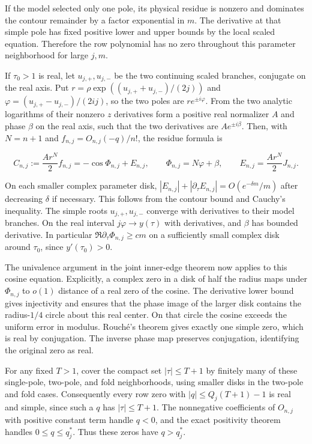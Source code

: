 \documentclass[11pt]{article}
\begin{document}
If the model selected only one pole, its physical residue is nonzero and dominates the contour remainder by a factor exponential in \(m\). The derivative at that simple pole has fixed positive lower and upper bounds by the local scaled equation. Therefore the row polynomial has no zero throughout this parameter neighborhood for large \(j,m\).

If \(\tau_0>1\) is real, let \(u_{j,+},u_{j,-}\) be the two continuing scaled branches, conjugate on the real axis. Put \(r=\rho\exp((u_{j,+}+u_{j,-})/(2j))\) and \(\varphi=(u_{j,+}-u_{j,-})/(2ij)\), so the two poles are \(r e^{\pm i\varphi}\). From the two analytic logarithms of their nonzero \(z\) derivatives form a positive real normalizer \(A\) and phase \(\beta\) on the real axis, such that the two derivatives are \(Ae^{\pm i\beta}\). Then, with \(N=n+1\) and \(f_{n,j}=O_{n,j}(-q)/n!\), the residue formula is

\begin{equation*}
C_{n,j}:=\frac{A r^N}{2} f_{n,j}=-\cos\Phi_{n,j}+E_{n,j},\qquad
\Phi_{n,j}=N\varphi+\beta,\qquad E_{n,j}=\frac{A r^N}{2}J_{n,j}.
\end{equation*}

On each smaller complex parameter disk, \(|E_{n,j}|+|\partial_\tau E_{n,j}|=O(e^{-\delta m}/m)\) after decreasing \(\delta\) if necessary. This follows from the contour bound and Cauchy's inequality. The simple roots \(u_{j,+},u_{j,-}\) converge with derivatives to their model branches. On the real interval \(j\varphi\to y(\tau)\) with derivatives, and \(\beta\) has bounded derivative. In particular \(\Re\partial_\tau\Phi_{n,j}\ge c m\) on a sufficiently small complex disk around \(\tau_0\), since \(y'(\tau_0)>0\).

The univalence argument in the joint inner-edge theorem now applies to this cosine equation. Explicitly, a complex zero in a disk of half the radius maps under \(\Phi_{n,j}\) to \(o(1)\) distance of a real zero of the cosine. The derivative lower bound gives injectivity and ensures that the phase image of the larger disk contains the radius-\(1/4\) circle about this real center. On that circle the cosine exceeds the uniform error in modulus. Rouché's theorem gives exactly one simple zero, which is real by conjugation. The inverse phase map preserves conjugation, identifying the original zero as real.

For any fixed \(T>1\), cover the compact set \(|\tau|\le T+1\) by finitely many of these single-pole, two-pole, and fold neighborhoods, using smaller disks in the two-pole and fold cases. Consequently every row zero with \(|q|\le Q_j(T+1)-1\) is real and simple, since such a \(q\) has \(|\tau|\le T+1\). The nonnegative coefficients of \(O_{n,j}\) with positive constant term handle \(q<0\), and the exact positivity theorem handles \(0\le q\le q_j^*\). Thus these zeros have \(q>q_j^*\).
\end{document}
